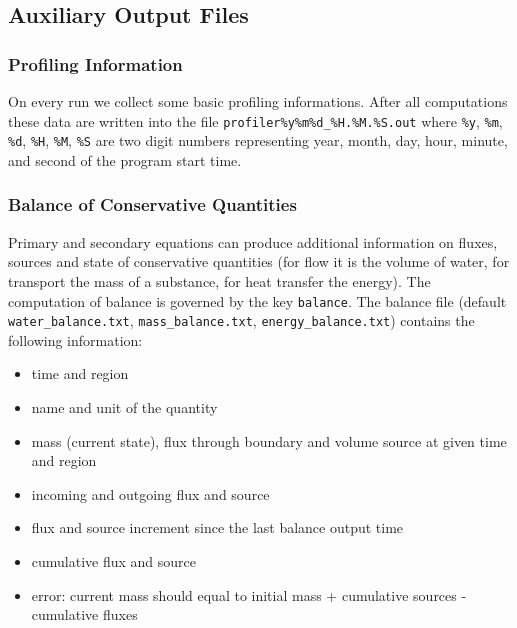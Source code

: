 

\subsection{Auxiliary Output Files}

\subsubsection{Profiling Information}
On every run we collect some basic profiling informations. After all computations these data are written into the file
\verb'profiler%y%m%d_%H.%M.%S.out' where \verb'%y', \verb'%m', \verb'%d', \verb'%H', \verb'%M', \verb'%S' are 
two digit numbers representing year, month, day, hour, minute, and second of the program start time.

\subsubsection{Balance of Conservative Quantities}
Primary and secondary equations can produce additional information on fluxes, sources and state of conservative quantities (for flow it is the volume of water, for transport the mass of a substance, for heat transfer the energy).
The computation of balance is governed by the key \verb'balance'.
The balance file (default \verb'water_balance.txt', \verb'mass_balance.txt', \verb'energy_balance.txt') contains the following information:
\begin{itemize}
\item time and region
\item name and unit of the quantity
\item mass (current state), flux through boundary and volume source at given time and region
\item incoming and outgoing flux and source
\item flux and source increment since the last balance output time
\item cumulative flux and source
\item error: current mass should equal to initial mass + cumulative sources - cumulative fluxes
\end{itemize}



